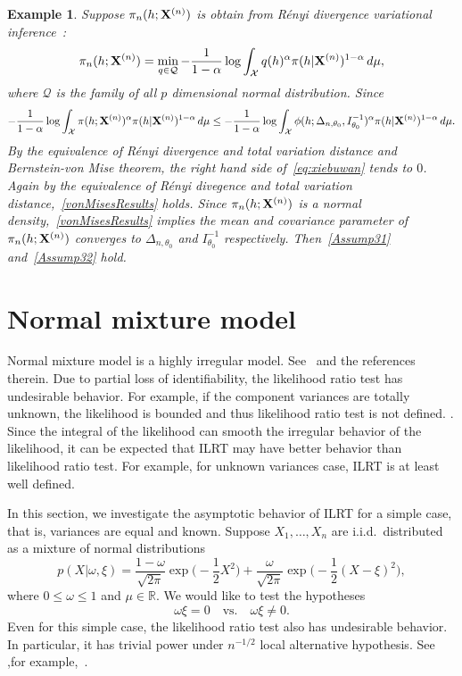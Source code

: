 \documentclass[11pt]{article}
\theoremstyle{plain}
\newtheorem{example}{Example}
\theoremstyle{definition}
\theoremstyle{remark}
\begin{document}
\begin{example}
    Suppose $\pi_n(h;\mathbf{X}^{(n)})$ is obtain from R\'{e}nyi divergence variational inference~\citep{NIPS2016_6208}:
    $$
        \pi_n(h;\mathbf{X}^{(n)})=\min_{q\in\mathcal{Q}} -\frac{1}{1-\alpha} \log \int_{\mathcal X} q(h)^{\alpha} \pi(h|\mathbf{X}^{(n)})^{1-\alpha}\, d\mu,
    $$
    where $\mathcal{Q}$ is the family of all $p$ dimensional normal distribution.
    Since
    \begin{equation}\label{eq:xiebuwan}
    -\frac{1}{1-\alpha} \log \int_{\mathcal X} \pi(h;\mathbf{X}^{(n)})^{\alpha} \pi(h|\mathbf{X}^{(n)})^{1-\alpha}\, d\mu
    \leq
    -\frac{1}{1-\alpha} \log \int_{\mathcal X} \phi(h;\Delta_{n,\theta_0}, I_{\theta_0}^{-1})^{\alpha} \pi(h|\mathbf{X}^{(n)})^{1-\alpha}\, d\mu.
    \end{equation}
    By the equivalence of R\'{e}nyi divergence and total variation distance and Bernstein-von Mise theorem, the right hand side of~\eqref{eq:xiebuwan} tends to $0$.
    Again by the equivalence of R\'{e}nyi divegence and total variation distance,~\eqref{vonMisesResults} holds.
    Since $\pi_n(h;\mathbf{X}^{(n)})$ is a normal density,~\eqref{vonMisesResults} implies the mean and covariance parameter of $\pi_n(h;\mathbf{X}^{(n)})$ converges to $\Delta_{n,\theta_0}$ and $I_{\theta_0}^{-1}$ respectively. Then~\eqref{Assump31} and~\eqref{Assump32} hold.
\end{example}




\section{Normal mixture model}
Normal mixture model is a highly irregular model.
See~\cite{chenjiahua2017} and the references therein.
Due to partial loss of identifiability, the likelihood ratio test has undesirable behavior.
For example, if the component variances are totally unknown, the likelihood is bounded and thus likelihood ratio test is not defined. \citep{Cam1990Maximum}.
Since the integral of the likelihood can smooth the irregular behavior of the likelihood, it can be expected that ILRT may have better behavior than likelihood ratio test.
For example, for unknown variances case, ILRT is at least well defined.

In this section, we investigate the asymptotic behavior of ILRT for a simple case, that is, variances are equal and known.
Suppose $X_1,\ldots,X_n$ are i.i.d.\ distributed as a mixture of normal distributions
\begin{equation*}
    p(X|\omega,\xi)=\frac{1-\omega}{\sqrt{2\pi}}\exp\big(-\frac{1}{2}X^2\big)
+\frac{\omega}{\sqrt{2\pi}}\exp\big(-\frac{1}{2}(X-\xi)^2\big),
\end{equation*}
where $0\leq \omega \leq 1$ and $\mu\in \mathbb{R}$.
We would like to test the hypotheses
\begin{equation}
    \omega \xi=0
    \quad \text{vs.}\quad
    \omega \xi \neq 0.
    \label{newHy}
\end{equation}
Even for this simple case, the likelihood ratio test also has undesirable behavior. In particular, it has trivial power under $n^{-1/2}$ local alternative hypothesis. See ,for example,~\cite{HALL2005158}.
\end{document}
